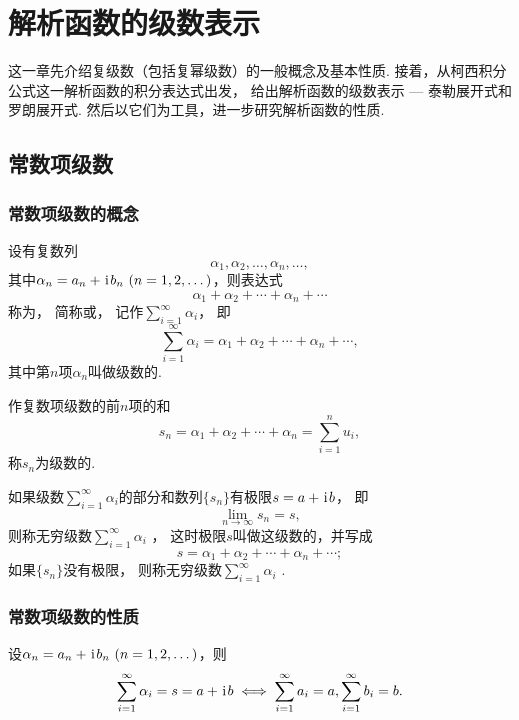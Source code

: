 \chapter{解析函数的级数表示}
这一章先介绍复级数（包括复幂级数）的一般概念及基本性质.
接着，从柯西积分公式这一解析函数的积分表达式出发，
给出解析函数的级数表示 --- 泰勒展开式和罗朗展开式.
然后以它们为工具，进一步研究解析函数的性质.

\section{常数项级数}
\subsection{常数项级数的概念}
\begin{definition}
设有复数列\[
\alpha_1,\alpha_2,\dotsc,\alpha_n,\dotsc,
\]其中\(\alpha_n=a_n+\iu b_n\ (n=1,2,\dotsc)\)，则表达式\[
\alpha_1+\alpha_2+\dotsb+\alpha_n+\dotsb
\]称为，
简称或，
记作\(\sum\limits_{i=1}^\infty \alpha_i\)，
即\[
\sum\limits_{i=1}^\infty \alpha_i = \alpha_1+\alpha_2+\dotsb+\alpha_n+\dotsb,
\]其中第\(n\)项\(\alpha_n\)叫做级数的.

作复数项级数的前\(n\)项的和\[
s_n = \alpha_1+\alpha_2+\dotsb+\alpha_n = \sum\limits_{i=1}^n{u_i},
\]称\(s_n\)为级数的.

如果级数\(\sum\limits_{i=1}^\infty \alpha_i\)的部分和数列\(\{s_n\}\)有极限\(s=a+\kern1pt\mathrm{i}\kern1pt b\)，
即\[
\lim\limits_{n\to\infty}s_n = s,
\]
则称无穷级数\(\sum\limits_{i=1}^\infty \alpha_i\) ，
这时极限\(s\)叫做这级数的，并写成\[
s = \alpha_1+\alpha_2+\dotsb+\alpha_n+\dotsb;
\]
如果\(\{s_n\}\)没有极限，
则称无穷级数\(\sum\limits_{i=1}^\infty \alpha_i\) .
\end{definition}

\subsection{常数项级数的性质}
\begin{theorem}\label{theorem:解析函数的级数表示.复级数与其实部及虚部级数的关系}
设\(\alpha_n=a_n+\iu b_n\ (n=1,2,\dots)\)，则\[
\sum\limits_{i=1}^\infty \alpha_i = s = a + \kern1pt\mathrm{i}\kern1pt b
\iff
\sum\limits_{i=1}^\infty a_i = a,
\sum\limits_{i=1}^\infty b_i = b.
\]
\end{theorem}

